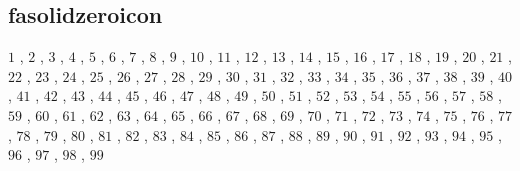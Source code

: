 \subsection{fasolidzeroicon}

$1$ , $2$ , $3$ , $4$ , $5$ , $6$ , $7$ , $8$ , $9$ , $10$ , $11$ , $12$ , $13$ , $14$ , $15$ , $16$ , $17$ , $18$ , $19$ , $20$ , $21$ , $22$ , $23$ , $24$ , $25$ , $26$ , $27$ , $28$ , $29$ , $30$ , $31$ , $32$ , $33$ , $34$ , $35$ , $36$ , $37$ , $38$ , $39$ , $40$ , $41$ , $42$ , $43$ , $44$ , $45$ , $46$ , $47$ , $48$ , $49$ , $50$ , $51$ , $52$ , $53$ , $54$ , $55$ , $56$ , $57$ , $58$ , $59$ , $60$ , $61$ , $62$ , $63$ , $64$ , $65$ , $66$ , $67$ , $68$ , $69$ , $70$ , $71$ , $72$ , $73$ , $74$ , $75$ , $76$ , $77$ , $78$ , $79$ , $80$ , $81$ , $82$ , $83$ , $84$ , $85$ , $86$ , $87$ , $88$ , $89$ , $90$ , $91$ , $92$ , $93$ , $94$ , $95$ , $96$ , $97$ , $98$ , $99$ 

